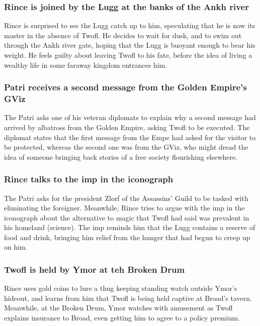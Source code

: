 \subsubsection{\Gls{Rince} is joined by the \Gls{Lugg} at the banks of the Ankh river}
\Gls{Rince} is surprised to see the \Gls{Lugg} catch up to him, speculating that he is now its
master in the absence of \Gls{Twofl}. He decides to wait for dusk, and to swim out through the
Ankh river gate, hoping that the \Gls{Lugg} is buoyant enough to bear his weight. He feels guilty
about leaving \Gls{Twofl} to his fate, before the idea of living a wealthy life in some faraway
kingdom entrances him.

\subsubsection{\Gls{Patri} receives a second message from the Golden Empire's \Gls{GViz}}
The \Gls{Patri} asks one of his veteran diplomats to explain why a second message had arrived by
albatross from the Golden Empire, asking \Gls{Twofl} to be executed. The diplomat states that the
first message from the \Gls{Empe} had asked for the visitor to be protected, whereas the second one
was from the \Gls{GViz}, who might dread the idea of someone bringing back stories of a free
society flourishing elsewhere.

\subsubsection{\Gls{Rince} talks to the imp in the iconograph}
The \Gls{Patri} asks for the president \Gls{Zlorf} of the Assassins' Guild to be tasked with
eliminating the foreigner. Meanwhile, \Gls{Rince} tries to argue with the imp in the iconograph
about the alternative to magic that \Gls{Twofl} had said was prevalent in his homeland (science).
The imp reminds him that the \Gls{Lugg} contains a reserve of food and drink, bringing him relief
from the hunger that had begun to creep up on him.

\subsubsection{\Gls{Twofl} is held by \Gls{Ymor} at teh Broken Drum}
\Gls{Rince} uses gold coins to lure a thug keeping standing watch outside \Gls{Ymor}'s hideout, and
learns from him that \Gls{Twofl} is being held captive at \Gls{Broad}'s tavern. Meanwhile, at the
Broken Drum, \Gls{Ymor} watches with amusement as \Gls{Twofl} explains insurance to \Gls{Broad},
even getting him to agree to a policy premium.

